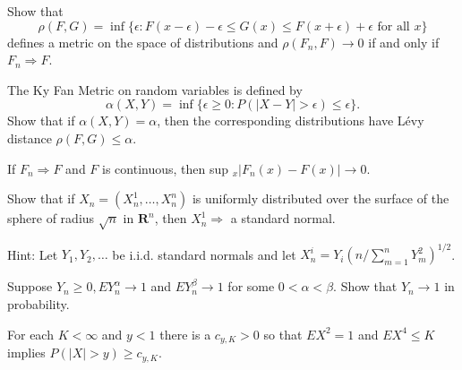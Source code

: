 \documentclass[en, normal, 11pt, black]{elegantnote}
\newenvironment{exercise}[1]{\begin{tcolorbox}[colback=black!15, colframe=black!80, breakable, title=#1]}{\end{tcolorbox}}
\begin{document}
    \begin{exercise}{3.2.6. The Lévy Metric}
        Show that
        \[
            \rho(F, G)=\inf \{\epsilon: F(x-\epsilon)-\epsilon \leq G(x) \leq F(x+\epsilon)+\epsilon \text { for all } x\}
        \]
        defines a metric on the space of distributions and $\rho\left(F_{n}, F\right) \rightarrow 0$ if and only if $F_{n} \Rightarrow F$. 
    \end{exercise}

    \begin{exercise}{3.2.7. }
        The Ky Fan Metric on random variables is defined by
        \[
            \alpha(X, Y)=\inf \{\epsilon \geq 0: P(|X-Y|>\epsilon) \leq \epsilon\}. 
        \]
        Show that if $\alpha(X, Y)=\alpha$, then the corresponding distributions have Lévy distance $\rho(F, G) \leq \alpha$. 
    \end{exercise}

    \begin{exercise}{3.2.9}
        If $F_{n} \Rightarrow F$ and $F$ is continuous, then sup $_{x}\left|F_{n}(x)-F(x)\right| \rightarrow 0$. 
    \end{exercise}

    \begin{exercise}{3.2.15}
        Show that if $X_{n}=\left(X_{n}^{1}, \ldots, X_{n}^{n}\right)$ is uniformly distributed over the surface of the sphere of radius $\sqrt{n}$ in $\mathbf{R}^{n}$, then $X_{n}^{1} \Rightarrow$ a standard normal. 
        
        Hint: Let $Y_{1}, Y_{2}, \ldots$ be i.i.d. standard normals and let $X_{n}^{i}=Y_{i}\left(n / \sum_{m=1}^{n} Y_{m}^{2}\right)^{1 / 2}$. 
    \end{exercise}

    \begin{exercise}{3.2.16}
        Suppose $Y_{n} \geq 0, E Y_{n}^{\alpha} \rightarrow 1$ and $E Y_{n}^{\beta} \rightarrow 1$ for some $0<\alpha<\beta$. Show that $Y_{n} \rightarrow 1$ in probability. 
    \end{exercise}
    
    \begin{exercise}{3.2.17}
        For each $K<\infty$ and $y<1$ there is a $c_{y, K}>0$ so that $E X^{2}=1$ and $E X^{4} \leq K$ implies $P(|X|>y) \geq c_{y, K}$. 
    \end{exercise}

  
\end{document}
